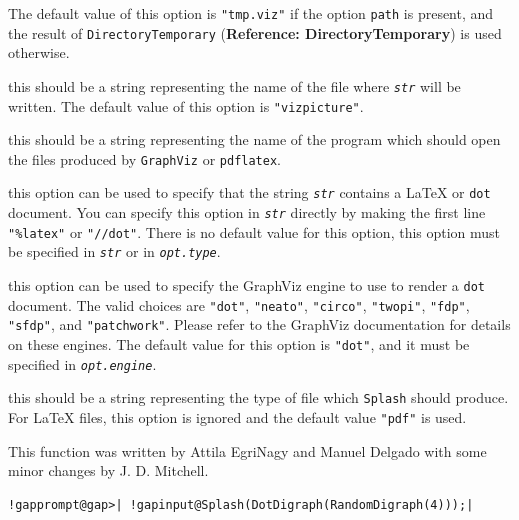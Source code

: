 \documentclass[a4paper,11pt]{report}
\begin{document}
{{{\begin{description}
 The default value of this option is \texttt{"tmp.viz"} if the option \texttt{path} is present, and the result of \texttt{DirectoryTemporary} (\textbf{Reference: DirectoryTemporary}) is used otherwise. 
\item[{filename}]  this should be a string representing the name of the file where \mbox{\texttt{\mdseries\slshape str}} will be written. The default value of this option is \texttt{"vizpicture"}. 
\item[{viewer}]  this should be a string representing the name of the program which should open
the files produced by \texttt{GraphViz} or \texttt{pdflatex}. 
\item[{type}]  this option can be used to specify that the string \mbox{\texttt{\mdseries\slshape str}} contains a {\LaTeX} or \texttt{dot} document. You can specify this option in \mbox{\texttt{\mdseries\slshape str}} directly by making the first line \texttt{"\%latex"} or \texttt{"//dot"}. There is no default value for this option, this option must be specified in \mbox{\texttt{\mdseries\slshape str}} or in \mbox{\texttt{\mdseries\slshape opt.type}}. 
\item[{engine}]  this option can be used to specify the GraphViz engine to use to render a \texttt{dot} document. The valid choices are \texttt{"dot"}, \texttt{"neato"}, \texttt{"circo"}, \texttt{"twopi"}, \texttt{"fdp"}, \texttt{"sfdp"}, and \texttt{"patchwork"}. Please refer to the GraphViz documentation for details on these engines. The
default value for this option is \texttt{"dot"}, and it must be specified in \mbox{\texttt{\mdseries\slshape opt.engine}}. 
\item[{filetype}]  this should be a string representing the type of file which \texttt{Splash} should produce. For {\LaTeX} files, this option is ignored and the default value \texttt{"pdf"} is used. 
\end{description}
 This function was written by Attila Egri\texttt{}Nagy and Manuel
Delgado with some minor changes by J. D. Mitchell.

 
\begin{Verbatim}[commandchars=!@|,fontsize=\small,frame=single,label=Example]
  !gapprompt@gap>| !gapinput@Splash(DotDigraph(RandomDigraph(4)));|
\end{Verbatim}
 }

 

}}
\end{document}
